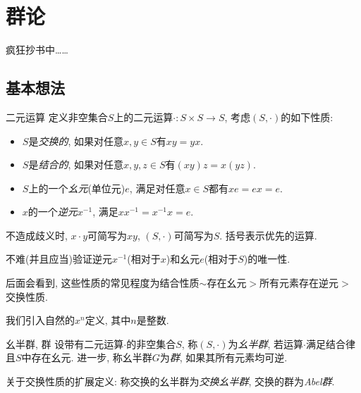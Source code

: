 \chapter{群论}

疯狂抄书中……

\section{基本想法}

\begin{definition}{二元运算}
	定义非空集合$S$上的二元运算$\cdot:S \times S \to S$, 考虑$(S,\cdot )$的如下性质:  
	\begin{itemize}
		\item $S$是\textit{交换的}, 如果对任意$x,y \in S$有$xy = yx$. 
		\item $S$是\textit{结合的}, 如果对任意$x,y,z \in S$有$(xy)z=x(yz)$. 
		\item $S$上的一个\textit{幺元}(单位元)$e$, 满足对任意$x \in S$都有$xe=ex=e$. 
		\item $x$的一个\textit{逆元}$x^{-1}$, 满足$xx^{-1} = x^{-1}x=e$. 
	\end{itemize}
\end{definition}
\begin{remark}
	不造成歧义时, $x\cdot y$可简写为$xy$, $(S,\cdot)$可简写为$S$. 括号表示优先的运算. 
\end{remark}
\begin{remark}
	不难(并且应当)验证逆元$x^{-1}$(相对于$x$)和幺元$e$(相对于$S$)的唯一性. 
\end{remark}
\begin{remark}
	后面会看到, 这些性质的常见程度为结合性质$\sim$存在幺元$>$所有元素存在逆元$>$交换性质. 
\end{remark}

我们引入自然的$x^n$定义, 其中$n$是整数. 

\begin{definition}{幺半群, 群}
	设带有二元运算$\cdot$的非空集合$S$, 称$(S,\cdot)$为\textit{幺半群}, 若运算$\cdot$满足结合律且$S$中存在幺元. 进一步, 称幺半群$G$为\textit{群}, 如果其所有元素均可逆. 
\end{definition}
\begin{remark}
	关于交换性质的扩展定义: 称交换的幺半群为\textit{交换幺半群}, 交换的群为\textit{Abel群}. 
\end{remark}

